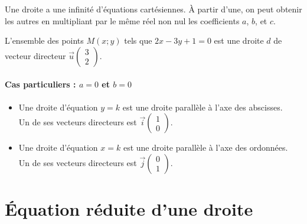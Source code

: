 \begin{Remarque}
Une droite a une infinité d'équations cartésiennes. À partir d'une, on peut obtenir les autres en multipliant par le même réel non nul les coefficients $a$, $b$, et $c$.
\end{Remarque}


\begin{Exemple}
L'ensemble des points $M(x;y)$ tels que $2x-3y+1=0$ est une droite $d$ de vecteur directeur $\overrightarrow{u}\begin{pmatrix}
3 \\
2
\end{pmatrix}$. 
\vspace{0.1cm}

\ligne

\ligne

\end{Exemple}

\paragraph{Cas particuliers : $a=0$ et $b=0$}
\begin{itemize}[label=\textcolor{Couleur8}{$\bullet$}]
\item Une droite d'équation $y=k$ est une droite parallèle à l'axe des abscisses. \\Un de ses vecteurs directeurs est $\overrightarrow{i}\begin{pmatrix}
1\\
0
\end{pmatrix}$.
\item  Une droite d'équation $x=k$ est une droite parallèle à l'axe des ordonnées. \\Un de ses vecteurs directeurs est $\overrightarrow{j}\begin{pmatrix}
0\\
1
\end{pmatrix}$.
\end{itemize}



\section{Équation réduite d'une droite}

